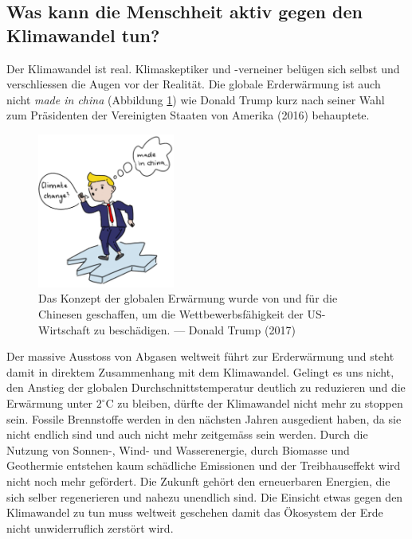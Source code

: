 \begin{refsection}
\subsection{Was kann die Menschheit aktiv gegen den Klimawandel tun?}
Der Klimawandel ist real. Klimaskeptiker und -verneiner belügen sich selbst und verschliessen die Augen vor der Realität. Die globale Erderwärmung ist auch nicht {\em made in china} (Abbildung \ref{DTrump}) wie Donald Trump kurz nach seiner Wahl zum Präsidenten der Vereinigten Staaten von Amerika (2016) behauptete.

\begin{figure}
\centering
\includegraphics[width=0.4\textwidth]{extrem/Trump.pdf}
\caption{Das Konzept der globalen Erwärmung wurde von und für die Chinesen geschaffen, um die Wettbewerbsfähigkeit der US-Wirtschaft zu beschädigen. --- Donald Trump (2017)}
\label{DTrump}
\end{figure}

Der massive Ausstoss von Abgasen weltweit führt zur Erderwärmung
und steht damit in direktem Zusammenhang mit dem Klimawandel. Gelingt
es uns nicht, den Anstieg der globalen Durchschnittstemperatur
deutlich zu reduzieren und die Erwärmung unter $2^{\circ}$C zu
bleiben, dürfte der Klimawandel nicht mehr zu stoppen sein.
Fossile Brennstoffe werden in den nächsten Jahren ausgedient haben,
da sie nicht endlich sind und auch nicht mehr zeitgemäss sein werden.
Durch die Nutzung von Sonnen-, Wind- und Wasserenergie, durch
Biomasse und Geothermie entstehen kaum schädliche Emissionen und
der Treibhauseffekt wird nicht noch mehr gefördert.
Die Zukunft gehört den erneuerbaren Energien, die sich selber
regenerieren und nahezu unendlich sind. Die Einsicht etwas gegen
den Klimawandel zu tun muss weltweit geschehen damit das Ökosystem
der Erde nicht unwiderruflich zerstört wird.



\end{refsection}
